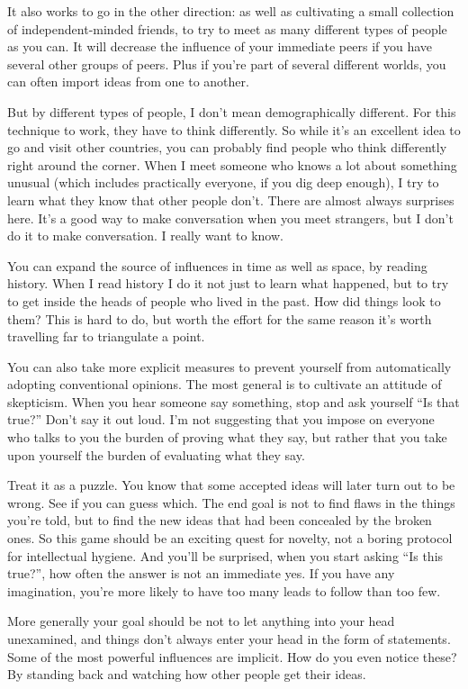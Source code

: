 \documentclass[12pt]{book}
\begin{document}
It also works to go in the other direction: as well as cultivating a
small collection of independent-minded friends, to try to meet as many
different types of people as you can. It will decrease the influence of
your immediate peers if you have several other groups of peers. Plus if
you're part of several different worlds, you can often import ideas from
one to another.

But by different types of people, I don't mean demographically
different. For this technique to work, they have to think differently.
So while it's an excellent idea to go and visit other countries, you can
probably find people who think differently right around the corner. When
I meet someone who knows a lot about something unusual (which includes
practically everyone, if you dig deep enough), I try to learn what they
know that other people don't. There are almost always surprises here.
It's a good way to make conversation when you meet strangers, but I
don't do it to make conversation. I really want to know.

You can expand the source of influences in time as well as space, by
reading history. When I read history I do it not just to learn what
happened, but to try to get inside the heads of people who lived in the
past. How did things look to them? This is hard to do, but worth the
effort for the same reason it's worth travelling far to triangulate a
point.

You can also take more explicit measures to prevent yourself from
automatically adopting conventional opinions. The most general is to
cultivate an attitude of skepticism. When you hear someone say
something, stop and ask yourself ``Is that true?'' Don't say it out
loud. I'm not suggesting that you impose on everyone who talks to you
the burden of proving what they say, but rather that you take upon
yourself the burden of evaluating what they say.

Treat it as a puzzle. You know that some accepted ideas will later turn
out to be wrong. See if you can guess which. The end goal is not to find
flaws in the things you're told, but to find the new ideas that had been
concealed by the broken ones. So this game should be an exciting quest
for novelty, not a boring protocol for intellectual hygiene. And you'll
be surprised, when you start asking ``Is this true?'', how often the
answer is not an immediate yes. If you have any imagination, you're more
likely to have too many leads to follow than too few.

More generally your goal should be not to let anything into your head
unexamined, and things don't always enter your head in the form of
statements. Some of the most powerful influences are implicit. How do
you even notice these? By standing back and watching how other people
get their ideas.
\end{document}
